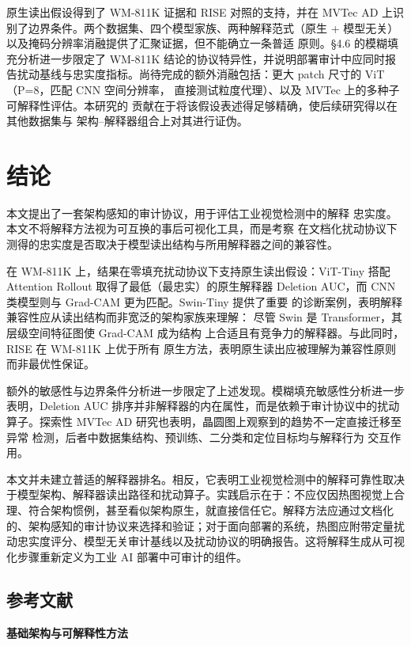\documentclass[11pt,a4paper]{article}
\begin{document}
原生读出假设得到了 WM-811K 证据和 RISE 对照的支持，并在 MVTec AD 上识别了边界条件。两个数据集、四个模型家族、两种解释范式（原生 + 模型无关）以及掩码分辨率消融提供了汇聚证据，但不能确立一条普适 原则。§4.6 的模糊填充分析进一步限定了 WM-811K 结论的协议特异性，并说明部署审计中应同时报告扰动基线与忠实度指标。尚待完成的额外消融包括：更大 patch 尺寸的 ViT（P=8，匹配 CNN 空间分辨率， 直接测试粒度代理）、以及 MVTec 上的多种子可解释性评估。本研究的 贡献在于将该假设表述得足够精确，使后续研究得以在其他数据集与 架构–解释器组合上对其进行证伪。

\section{结论}

本文提出了一套架构感知的审计协议，用于评估工业视觉检测中的解释 忠实度。本文不将解释方法视为可互换的事后可视化工具，而是考察 在文档化扰动协议下测得的忠实度是否取决于模型读出结构与所用解释器之间的兼容性。

在 WM-811K 上，结果在零填充扰动协议下支持原生读出假设：ViT-Tiny 搭配 Attention Rollout 取得了最低（最忠实）的原生解释器 Deletion AUC，而 CNN 类模型则与 Grad-CAM 更为匹配。Swin-Tiny 提供了重要 的诊断案例，表明解释兼容性应从读出结构而非宽泛的架构家族来理解： 尽管 Swin 是 Transformer，其层级空间特征图使 Grad-CAM 成为结构 上合适且有竞争力的解释器。与此同时，RISE 在 WM-811K 上优于所有 原生方法，表明原生读出应被理解为兼容性原则而非最优性保证。

额外的敏感性与边界条件分析进一步限定了上述发现。模糊填充敏感性分析进一步表明，Deletion AUC 排序并非解释器的内在属性，而是依赖于审计协议中的扰动算子。探索性 MVTec AD 研究也表明，晶圆图上观察到的趋势不一定直接迁移至异常 检测，后者中数据集结构、预训练、二分类和定位目标均与解释行为 交互作用。

本文并未建立普适的解释器排名。相反，它表明工业视觉检测中的解释可靠性取决于模型架构、解释器读出路径和扰动算子。实践启示在于：不应仅因热图视觉上合理、符合架构惯例，甚至看似架构原生，就直接信任它。解释方法应通过文档化的、架构感知的审计协议来选择和验证；对于面向部署的系统，热图应附带定量扰动忠实度评分、模型无关审计基线以及扰动协议的明确报告。这将解释生成从可视化步骤重新定义为工业 AI 部署中可审计的组件。

\subsection*{参考文献}

\textbf{基础架构与可解释性方法}
\end{document}
